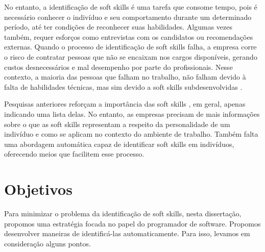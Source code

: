 No entanto, a identificação de soft skills é uma tarefa que consome tempo, pois é necessário conhecer o indivíduo e seu comportamento durante um determinado período, até ter condições de reconhecer suas habilidades. Algumas vezes também, requer esforços como entrevistas com os candidatos ou recomendações externas.
Quando o processo de identificação de soft skills falha, a empresa corre o risco de contratar pessoas que não se encaixam nos cargos disponíveis, gerando custos desnecessários e mal desempenho por parte do profissionais.
Nesse contexto, a maioria das pessoas que falham no trabalho, não falham devido à falta de habilidades técnicas, mas sim devido a soft skills subdesenvolvidas \cite{bolton:86} \cite{mcgee:96}.

Pesquisas anteriores reforçam a importância das soft skills \cite {ahmed:12} \cite{sterling:03} \cite{rehman:12},
em geral, apenas indicando uma lista delas.
No entanto, as empresas precisam de mais informações
sobre o que as soft skills representam a respeito da personalidade de um indivíduo e como se aplicam no contexto do ambiente de trabalho.
Também falta uma abordagem automática capaz de identificar soft skills em indivíduos, oferecendo meios que facilitem esse processo.


\section{Objetivos}

Para minimizar o problema da identificação de soft skills, nesta dissertação, propomos uma estratégia focada no papel do programador de software.
Propomos desenvolver maneiras de identificá-las automaticamente. Para isso, levamos em consideração alguns pontos.



